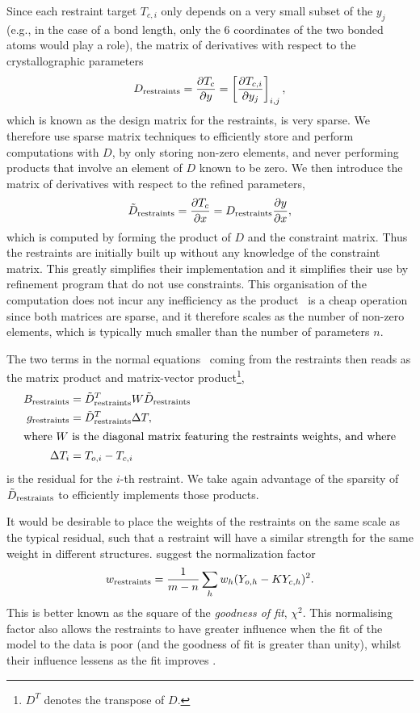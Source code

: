 \documentclass[pdf]{iucr}
\begin{document}
Since each restraint target $T_{c,i}$ only depends on a very small subset of the $y_j$ (e.g., in the case of a bond length, only the 6 coordinates of the two bonded atoms would play a role), the matrix of derivatives with respect to the crystallographic parameters
\begin{equation}
D_{\text{restraints}} = \frac{\partial T_c}{\partial y} = \left[\frac{\partial T_{c,i}}{\partial y_j}\right]_{i,j},
\end{equation}
which is known as the design matrix for the restraints, is very sparse. We therefore use sparse matrix techniques to efficiently store and perform computations with $D$, by only storing non-zero elements, and never performing products that involve an element of $D$ known to be zero. We then introduce the matrix of derivatives with respect to the refined parameters,
\begin{equation}
\tilde{D}_{\text{restraints}} = \frac{\partial T_c}{\partial x} = D_{\text{restraints}} \frac{\partial y}{\partial x},
\label{eqn:constraints:applied:torestraints}
\end{equation}
which is computed by forming the product of $D$ and the constraint matrix. Thus the restraints are initially built up without any knowledge of the constraint matrix. This greatly simplifies their implementation and it simplifies their use by refinement program that do not use constraints. This organisation of the computation does not incur any inefficiency as the product~ is a cheap operation since both matrices are sparse, and it therefore scales as the number of non-zero elements, which is typically much smaller than the number of parameters $n$. 

The two terms in the normal equations~ coming from the restraints then reads as the matrix product and matrix-vector product\footnote{$D^T$ denotes the transpose of $D$.},
\begin{align}
B_{\text{restraints}} &= \tilde{D}_{\text{restraints}}^T W \tilde{D}_{\text{restraints}}\\
g_{\text{restraints}} &= \tilde{D}_{\text{restraints}}^T \Delta T,\\
\intertext{where $W$ is the diagonal matrix featuring the restraints weights, and where}
\Delta T_i &= T_{o,i} - T_{c,i}
\end{align}
is the residual for the $i$-th restraint. We take again advantage of the sparsity of $\tilde{D}_{\text{restraints}}$ to efficiently implements those products.

It would be desirable to place the weights of the restraints on the same scale as the typical residual, such that a restraint will have a similar strength for the same weight in different structures. \cite{Giacovazzo:2002aa} suggest the normalization factor
\begin{equation}
w_{\text{restraints}} = \frac{1}{m-n} \sum_{h}{ w_h (Y_{o,h} - K Y_{c,h})^2}.
\label{eqn:giacovazzo_normalisation}
\end{equation}
This is better known as the square of the \emph{goodness of fit}, $\chi^2$. This normalising factor also allows the restraints to have greater influence when the fit of the model to the data is poor (and the goodness of fit is greater than unity), whilst their influence lessens as the fit improves \cite{Sheldrick:1997aa}.
\end{document}
